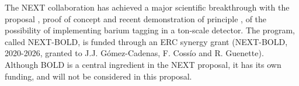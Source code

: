 \indent

The NEXT collaboration has achieved a major scientific breakthrough with the proposal \cite{Nygren_2015}, proof of concept \cite{McDonald:2017izm} and recent demonstration of principle \cite{ rivilla_fluorescent_2020}, of the possibility of implementing barium tagging in a ton-scale detector. The program, called NEXT-BOLD, is funded through an ERC synergy grant (NEXT-BOLD, 2020-2026, granted to J.J. G\'omez-Cadenas, F. Coss\'io and R. Guenette). Although BOLD is a central ingredient in the NEXT proposal, it has its own funding, and will not be considered in this proposal. 

